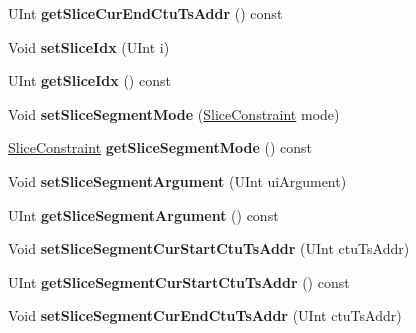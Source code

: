 \begin{DoxyCompactItemize}
\mbox{\label{class_t_com_slice_a3c21478edb085de81ef57667c31b7f84}} 
U\+Int {\bfseries get\+Slice\+Cur\+End\+Ctu\+Ts\+Addr} () const
\item 
\mbox{\label{class_t_com_slice_aac0b2595274279dfaaded816086d0f23}} 
Void {\bfseries set\+Slice\+Idx} (U\+Int i)
\item 
\mbox{\label{class_t_com_slice_a894494c9164a49494ff673ab62bcebd0}} 
U\+Int {\bfseries get\+Slice\+Idx} () const
\item 
\mbox{\label{class_t_com_slice_a9ef5599af5a887057537a39711c7820e}} 
Void {\bfseries set\+Slice\+Segment\+Mode} (\hyperlink{_type_def_8h_add7235a66eb4e5f93c692468c39dde44}{Slice\+Constraint} mode)
\item 
\mbox{\label{class_t_com_slice_af0c3cb7f0acb0484e360f2f3decee39b}} 
\hyperlink{_type_def_8h_add7235a66eb4e5f93c692468c39dde44}{Slice\+Constraint} {\bfseries get\+Slice\+Segment\+Mode} () const
\item 
\mbox{\label{class_t_com_slice_afa1360717ff015d1f9e416672f3bb496}} 
Void {\bfseries set\+Slice\+Segment\+Argument} (U\+Int ui\+Argument)
\item 
\mbox{\label{class_t_com_slice_a2132859da95d5f148a1216661d8f88ac}} 
U\+Int {\bfseries get\+Slice\+Segment\+Argument} () const
\item 
\mbox{\label{class_t_com_slice_a6c0e7503283c6f8a353232fc7d79e2e1}} 
Void {\bfseries set\+Slice\+Segment\+Cur\+Start\+Ctu\+Ts\+Addr} (U\+Int ctu\+Ts\+Addr)
\item 
\mbox{\label{class_t_com_slice_a75481306690e3946e27203e6009204ec}} 
U\+Int {\bfseries get\+Slice\+Segment\+Cur\+Start\+Ctu\+Ts\+Addr} () const
\item 
\mbox{\label{class_t_com_slice_a31353021d7a50cda1dd7e81688216d82}} 
Void {\bfseries set\+Slice\+Segment\+Cur\+End\+Ctu\+Ts\+Addr} (U\+Int ctu\+Ts\+Addr)
\item 
\mbox{\label{class_t_com_slice_aa59c69881528a93faebb386204d0d9e2}} 

\end{DoxyCompactItemize}
